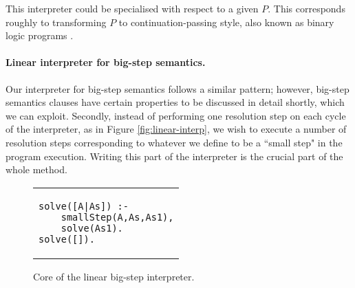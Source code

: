 \documentclass{llncs}
\begin{document}
This interpreter could be specialised with respect to a given $P$.  This corresponds roughly to transforming $P$ to continuation-passing
style, also known as binary logic programs \cite{Demoen}.

\paragraph{Linear interpreter for big-step semantics.} 
Our interpreter for big-step semantics follows a similar pattern; however, big-step semantics clauses have certain
properties to be discussed in detail shortly, which we can exploit.  Secondly, instead of performing one resolution step on each cycle of the interpreter,
as in Figure \ref{fig:linear-interp}, we wish to execute a number of resolution steps corresponding to whatever we define to be a ``small step" in the 
program execution.  Writing this part of the interpreter is the crucial part of the whole method.

\begin{figure}
\begin{tabular}{l}
\begin{lstlisting}
solve([A|As]) :- 
	smallStep(A,As,As1),
	solve(As1).
solve([]).
\end{lstlisting}
\end{tabular}
\caption{Core of the linear big-step interpreter.}\label{fig:linear-bigstep}
\end{figure}

\

%

\end{document}
